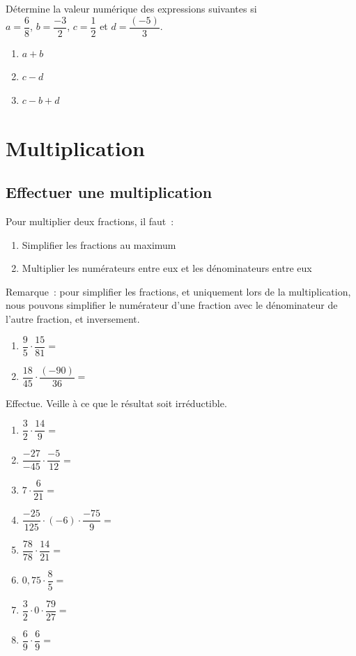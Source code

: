 \documentclass[../../syllabus_2.tex]{subfiles}
\begin{document}
\begin{exercise} 
  Détermine la valeur numérique des expressions suivantes si \\
  $a=\dfrac{6}{8}$, 
  $b=\dfrac{-3}{2}$,
  $c=\dfrac{1}{2}$ et 
  $d=\dfrac{(-5)}{3}$.
  \begin{enumerate}[cols=3, ]
    \item $a+b$
    \item $c-d$
    \item $c-b+d$
  \end{enumerate}
  \vspace*{3cm}
\end{exercise}

\newpage
\section{Multiplication}
\subsection{Effectuer une multiplication}
Pour multiplier deux fractions, il faut~:
\begin{enumerate}[]
  \item Simplifier les fractions au maximum
  \item Multiplier les numérateurs entre eux et les dénominateurs entre eux

\end{enumerate}

Remarque~: pour simplifier les fractions, et uniquement lors de la multiplication, nous pouvons simplifier le numérateur d'une fraction avec le dénominateur de l'autre fraction, et inversement.

\exemple 
\begin{enumerate}[cols=2]
  \item $\dfrac{9}{5} \cdot \dfrac{15}{81}=$
  \item $\dfrac{18}{45} \cdot \dfrac{(-90)}{36}=$
\end{enumerate}
\vspace*{2cm}

\begin{exercise}
  Effectue. Veille à ce que le résultat soit irréductible.
  \begin{enumerate}[cols=2, itemsep=2cm]
    \item $\dfrac{3}{2} \cdot \dfrac{14}{9}=$
    \item $\dfrac{-27}{-45} \cdot \dfrac{-5}{12}=$
    \item $7 \cdot \dfrac{6}{21}=$
    \item $\dfrac{-25}{125} \cdot (-6) \cdot \dfrac{-75}{9}=$
    \item $\dfrac{78}{78} \cdot \dfrac{14}{21}=$
    \item $0,75\cdot \dfrac{8}{5}=$
    \item $\dfrac{3}{2} \cdot 0 \cdot \dfrac{79}{27}=$
    \item $\dfrac{6}{9} \cdot \dfrac{6}{9}=$
  \end{enumerate}
  \vspace*{2cm}
\end{exercise}
\end{document}
